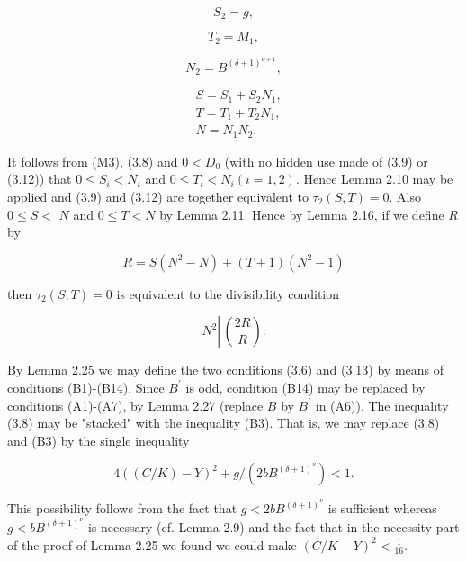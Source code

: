 \documentclass[11pt,a4paper]{article}
\newcommand{\origpage}[1]{\marginnote{\footnotesize\textbf{[#1]}}}
\begin{document}
\begin{equation*}
S_{2}=g, \tag{M10}
\end{equation*}

\begin{equation*}
T_{2}=M_{1}, \tag{M11}
\end{equation*}

\begin{equation*}
N_{2}=B^{(\delta+1)^{\nu+1}}, \tag{M12}
\end{equation*}

\begin{align*}
& S=S_{1}+S_{2} N_{1},  \tag{M13}\\
& T=T_{1}+T_{2} N_{1},  \tag{M14}\\
& N=N_{1} N_{2} . \tag{M15}
\end{align*}


It follows from (M3), (3.8) and $0<D_{0}$ (with no hidden use made of (3.9) or (3.12)) that $0 \leq S_{i}<N_{i}$ and $0 \leq T_{i}<N_{i}(i=1,\allowbreak 2)$. Hence Lemma 2.10 may be applied and (3.9) and (3.12) are together equivalent to $\tau_{2}(S,\allowbreak  T)=0$. Also $0 \leq S<$ $N$ and $0 \leq T<N$ by Lemma 2.11. Hence by Lemma 2.16, if we define $R$ by


\begin{equation*}
R=S\left(N^{2}-N\right)+(T+1)\left(N^{2}-1\right) \tag{M16}
\end{equation*}


then $\tau_{2}(S,\allowbreak  T)=0$ is equivalent to the divisibility condition


\begin{equation*}
N^{2} \left\lvert\,\binom{ 2 R}{R} .\right. \tag{3.13}
\end{equation*}


By Lemma 2.25 we may define the two conditions (3.6) and (3.13) by means of conditions (B1)-(B14). Since $B^{\prime}$ is odd, condition (B14) may be replaced by conditions (A1)-(A7), by Lemma 2.27 (replace $B$ by $B^{\prime}$ in (A6)). The inequality (3.8) may be "stacked" with the inequality (B3). That is, we may replace (3.8) and (B3) \origpage{563}by the single inequality


\begin{equation*}
4((C / K)-Y)^{2}+g /\left(2 b B^{(\delta+1)^{\nu}}\right)<1 . \tag{B3'}
\end{equation*}


This possibility follows from the fact that $g<2 b B^{(\delta+1)^{\nu}}$ is sufficient whereas $g<b B^{(\delta+1)^{\nu}}$ is necessary (cf. Lemma 2.9) and the fact that in the necessity part of the proof of Lemma 2.25 we found we could make $(C / K-Y)^{2}<\frac{1}{16}$.
\end{document}
